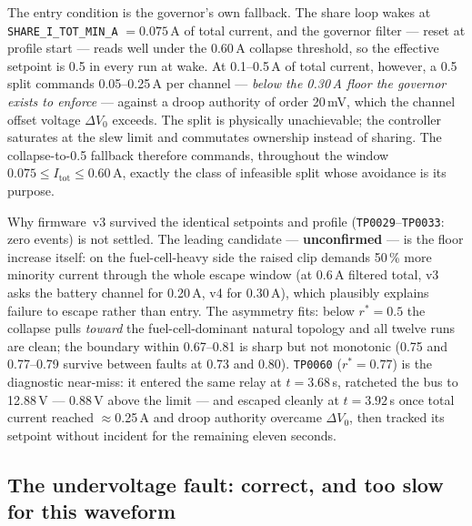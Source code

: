 \documentclass[11pt]{article}
\newcommand{\code}[1]{\texttt{#1}}
\begin{document}
The entry condition is the governor's own fallback. The share loop wakes at
\code{SHARE\_I\_TOT\_MIN\_A} $=0.075$\,A of total current, and the governor
filter --- reset at profile start --- reads well under the 0.60\,A collapse
threshold, so the effective setpoint is 0.5 in every run at wake. At
0.1--0.5\,A of total current, however, a 0.5 split commands 0.05--0.25\,A per
channel --- \emph{below the 0.30\,A floor the governor exists to enforce} ---
against a droop authority of order 20\,mV, which the channel offset voltage
$\Delta V_0$ exceeds. The split is physically unachievable; the controller
saturates at the slew limit and commutates ownership instead of sharing. The
collapse-to-0.5 fallback therefore commands, throughout the window
$0.075 \leq I_\mathrm{tot} \leq 0.60$\,A, exactly the class of infeasible split
whose avoidance is its purpose.

Why firmware~v3 survived the identical setpoints and profile
(\code{TP0029}--\code{TP0033}: zero events) is not settled. The leading
candidate --- \textbf{unconfirmed} --- is the floor increase itself: on the
fuel-cell-heavy side the raised clip demands 50\,\% more minority current
through the whole escape window (at 0.6\,A filtered total, v3 asks the battery
channel for 0.20\,A, v4 for 0.30\,A), which plausibly explains failure to
escape rather than entry. The asymmetry fits: below $r^\ast=0.5$ the collapse
pulls \emph{toward} the fuel-cell-dominant natural topology and all twelve runs
are clean; the boundary within 0.67--0.81 is sharp but not monotonic
(0.75 and 0.77--0.79 survive between faults at 0.73 and 0.80).
\code{TP0060} ($r^\ast=0.77$) is the diagnostic near-miss: it entered the same
relay at $t=3.68$\,s, ratcheted the bus to 12.88\,V --- 0.88\,V above the
limit --- and escaped cleanly at $t=3.92$\,s once total current reached
$\approx$0.25\,A and droop authority overcame $\Delta V_0$, then tracked its
setpoint without incident for the remaining eleven seconds.

\subsection{The undervoltage fault: correct, and too slow for this waveform}
\end{document}
